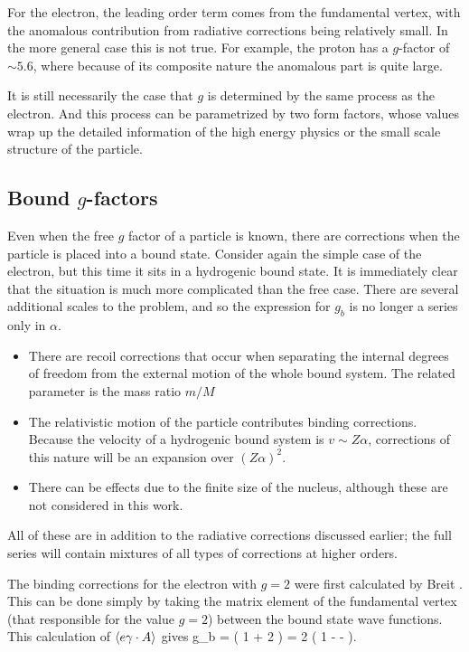 For the electron, the leading order term comes from the fundamental vertex, with the anomalous contribution from radiative corrections being relatively small.  In the more general case this is not true.  For example, the proton has a $g$-factor of $\sim 5.6$, where because of its composite nature the anomalous part is quite large.

It is still necessarily the case that $g$ is determined by the same process as the electron.  And this process can be parametrized by two form factors, whose values wrap up the detailed information of the high energy physics or the small scale structure of the particle. 

\subsection{Bound $g$-factors}

Even when the free $g$ factor of a particle is known, there are corrections when the particle is placed into a bound state.  Consider again the simple case of the electron, but this time it sits in a hydrogenic bound state.  It is immediately clear that the situation is much more complicated than the free case.  There are several additional scales to the problem, and so the expression for $g_b$ is no longer a series only in $\alpha$.
\begin{itemize}
  \item 	There are recoil corrections that occur when separating the internal degrees of freedom from the external motion of the whole bound system.  The related parameter is the mass ratio $m/M$	%
  \item 	The relativistic motion of the particle contributes binding corrections.  Because the velocity of a hydrogenic bound system is $v \sim Z\alpha$, corrections of this nature will be an expansion over $(Z\alpha)^2$.
  \item		There can be effects due to the finite size of the nucleus, although these are not considered in this work.
\end{itemize}
All of these are in addition to the radiative corrections discussed earlier; the full series will contain mixtures of all types of corrections at higher orders.

The binding corrections for the electron with $g=2$ were first calculated by Breit \cite{Breit1928}.  This can be done simply by taking the matrix element of the fundamental vertex (that responsible for the value $g=2$)  between the bound state wave functions.  This calculation of $\left<  e\gamma \cdot A \right>$ gives
\beq 
	g_b =  \left( 1 + 2 \right)  = 2 \left( 1 -  -  \right ).
\eeq

